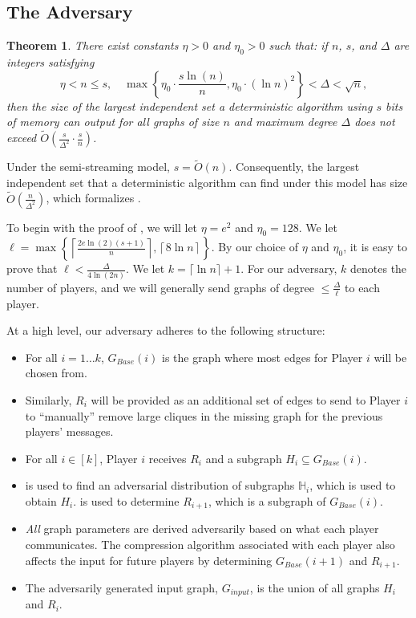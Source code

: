 \documentclass[11pt]{article}
\newtheorem{theorem}{Theorem}
\theoremstyle{definition}
\renewcommand{\leq}{\leqslant}
\renewcommand{\le}{\leq}
\newcommand{\Ot}{\ensuremath{\widetilde{O}}}
\begin{document}
\subsection{The Adversary}

\begin{theorem}\label{main-theorem}
    There exist constants $\eta>0$ and $\eta_0>0$ such that: if $n$, $s$, and $\Delta$ are integers satisfying
    \[ \quad \eta<n\le s, \quad \max\left\{\eta_0\cdot \frac{s\ln(n)}n, \eta_0\cdot {(\ln n)}^2 \right \}< \Delta < \sqrt n,\]
    then the size of the largest independent set a deterministic algorithm using $s$ bits of memory can output for all graphs of size $n$ and maximum degree $\Delta$ does not exceed $\Ot\left(\frac s{\Delta^2}\cdot \frac sn\right)$. 
\end{theorem}

Under the semi-streaming model, $s=\Ot(n)$. Consequently, the largest independent set that a deterministic algorithm can find under this model has size $\Ot\left(\frac n{\Delta^2}\right)$, which formalizes .

\newcommand{\distribFac}{\ell}

To begin with the proof of , we will let $\eta=e^2$ and $\eta_0=128$. We let ${\distribFac}=\max\left\{\left\lceil\frac{2e\ln(2)(s+1)}n \right\rceil, \left\lceil8\ln n\right\rceil\right\}$. By our choice of $\eta$ and $\eta_0$, it is easy to prove that ${\distribFac}<\frac{\Delta}{4\ln(2n)}$. We let $k=\lceil \ln n\rceil +1$. For our adversary, $k$ denotes the number of players, and we will generally send graphs of degree $\le \frac{\Delta}{\distribFac}$ to each player. 

At a high level, our adversary adheres to the following structure:
\begin{itemize}
    \item For all $i=1\dots k$, $G_{Base}(i)$ is the graph where most edges for Player $i$ will be chosen from.
    \item Similarly, $R_i$ will be provided as an additional set of edges to send to Player $i$ to ``manually'' remove large cliques in the missing graph for the previous players' messages. 
    \item For all $i\in [k]$, Player $i$ receives $R_i$ and a subgraph $H_i\subseteq G_{Base}(i)$. 
    \item {} is used to find an adversarial distribution of subgraphs $\mathbb{H}_i$, which is used to obtain $H_i$.  is used to determine $R_{i+1}$, which is a subgraph of $G_{Base}(i)$.
    \item \textit{All} graph parameters are derived adversarily based on what each player communicates. The compression algorithm associated with each player also affects the input for future players by determining $G_{Base}(i+1)$ and $R_{i+1}$.
    \item The adversarily generated input graph, $G_{input}$, is the union of all graphs $H_i$ and $R_i$. 
\end{itemize}
\end{document}
